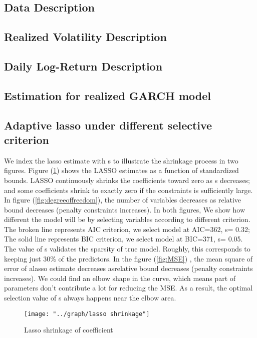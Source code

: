 \documentclass[titlepage,11pt]{article}
\begin{document}
\subsection{Data Description}
\subsection{Realized Volatility Description}
\subsection{Daily Log-Return Description}
\subsection{Estimation for realized GARCH model}
\subsection{Adaptive lasso under different selective criterion}
 We index the lasso estimate with s to illustrate the shrinkage process in two figures.
 Figure (\ref{fig:lassoshrinkage})  shows the LASSO estimates as a function of standardized bounds. LASSO continuously shrinks the coefficients toward zero as s decreases; and some coefficients shrink to exactly zero if the constraints is sufficiently large. 
 In  figure (\ref{fig:degreeoffreedom}), the number of variables decreases as relative bound  decreases  (penalty constraints increases).  In both figures, We show how different the model will be by selecting variables according to different criterion. The broken line represents AIC criterion, we select model at AIC=362, s= 0.32; The  solid line represents BIC criterion, we select model at BIC=371, s= 0.05. The value of s validates the sparsity of true model. Roughly, this corresponds to keeping just $30\%$  of the predictors.  In the figure (\ref{fig:MSE}) , the mean square of error of alasso estimate decreases asrelative bound  decreases  (penalty constraints increases). We could find an elbow shape in the curve, which means part of parameters don't contribute a lot for reducing the MSE. As a result, the optimal selection value of s always happens near the elbow area. 
 
 \begin{figure} [!htbp]
 	\centering
 	\texttt{[image: "../graph/lasso shrinkage"]}
 	\caption{Lasso shrinkage of coefficient}
 	\label{fig:lassoshrinkage}
 	
 \end{figure}
 
\end{document}
